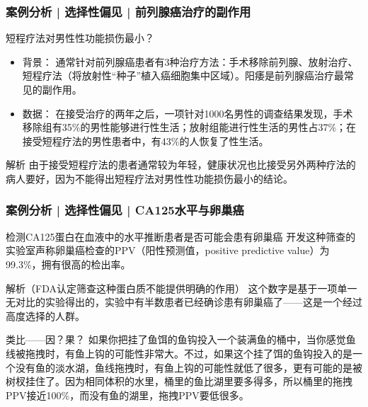 \begin{frame}
  \frametitle{案例分析 | 选择性偏见 | 前列腺癌治疗的副作用}
  \begin{block}{短程疗法对男性性功能损伤最小？}
    \begin{itemize}
      \item 背景：
通常针对前列腺癌患者有3种治疗方法：手术移除前列腺、放射治疗、短程疗法（将放射性“种子”植入癌细胞集中区域）。阳痿是前列腺癌治疗最常见的副作用。
      \item 数据： 在接受治疗的两年之后，一项针对1000名男性的调查结果发现，手术移除组有35\%的男性能够进行性生活；放射组能进行性生活的男性占37\%；在接受短程疗法的男性患者中，有43\%的人恢复了性生活。
    \end{itemize}
  \end{block}
  \pause \pause \pause \pause
  \begin{block}{解析}
    由于接受短程疗法的患者通常较为年轻，健康状况也比接受另外两种疗法的病人要好，因为不能得出短程疗法对男性性功能损伤最小的结论。
  \end{block}
\end{frame}

\begin{frame}
  \frametitle{案例分析 | 选择性偏见 | CA125水平与卵巢癌}
  \begin{block}{检测CA125蛋白在血液中的水平推断患者是否可能会患有卵巢癌}
    开发这种筛查的实验室声称卵巢癌检查的PPV（阳性预测值，positive predictive value）为99.3\%，拥有很高的检出率。
  \end{block}
  \pause \pause \pause \pause
  \vspace{-0.3em}
  \begin{block}{解析（FDA认定筛查这种蛋白质不能提供明确的作用）}
    这个数字是基于一项单一无对比的实验得出的，实验中有半数患者已经确诊患有卵巢癌了——这是一个经过高度选择的人群。
  \end{block}
  \pause \pause \pause \pause
  \vspace{-0.3em}
  \begin{block}{类比——因？果？}
    如果你把挂了鱼饵的鱼钩投入一个装满鱼的桶中，当你感觉鱼线被拖拽时，有鱼上钩的可能性非常大。不过，如果这个挂了饵的鱼钩投入的是一个没有鱼的淡水湖，鱼线拖拽时，有鱼上钩的可能性就低了很多，更有可能的是被树杈挂住了。因为相同体积的水里，桶里的鱼比湖里要多得多，所以桶里的拖拽PPV接近100\%，而没有鱼的湖里，拖拽PPV要低很多。
  \end{block}
\end{frame}

